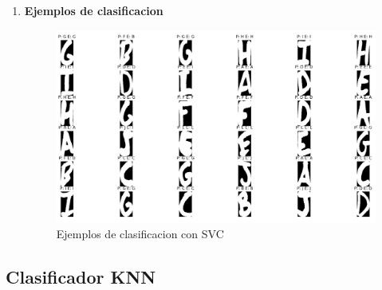 \documentclass[8pt,a4paper]{{esannV2}}
\begin{document}
\begin{enumerate}
\item \textbf{Ejemplos de clasificacion}

\begin{figure}[htbp]
\centering
    \includegraphics[scale=0.15]{./SVC100_50.png}
    \caption{Ejemplos de clasificacion con SVC}
\end{figure}
\end{enumerate}

\newpage


\subsection{Clasificador KNN}
\end{document}
